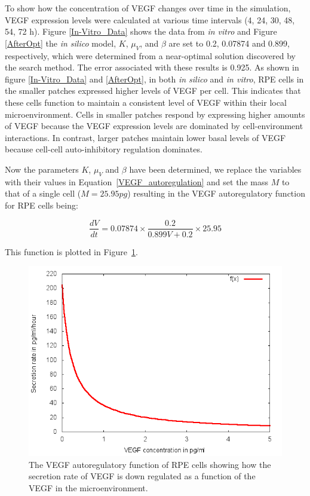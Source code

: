 To show how the concentration of VEGF changes over time in the simulation, VEGF expression levels were calculated at various time intervals (4, 24, 30, 48, 54, 72 h). Figure \ref{In-Vitro_Data} shows the data from \textit{in vitro} and Figure \ref{AfterOpt} the \textit{in silico} model, $K$, $\mu _{V}$, and $\beta$ are set to 0.2, 0.07874 and 0.899, respectively, which were determined from a near-optimal solution discovered by the search method. The error associated with these results is 0.925. %
As shown in figure \ref{In-Vitro_Data} and \ref{AfterOpt}, in both \textit{in silico} and \textit{in vitro}, RPE cells in the smaller patches expressed higher levels of VEGF per cell. This indicates that these cells function to maintain a consistent level of VEGF within their local microenvironment. Cells in smaller patches respond by expressing higher amounts of VEGF because the VEGF expression levels are dominated by cell-environment interactions. In contrast, larger patches maintain lower basal levels of VEGF because cell-cell auto-inhibitory regulation dominates.

Now the parameters $K$, $\mu_V$ and $\beta$ have been determined, we replace the variables with their values in Equation~\ref{VEGF_autoregulation} and set the mass $M$ to that of a single cell ($M = 25.95 pg$) resulting in the VEGF autoregulatory function for RPE cells being:

\begin{equation}
 \frac{d V}{d t}= 0.07874 \times \frac{0.2}{ 0.899 V+0.2} \times 25.95
 \label{VEGF_final}
 \end{equation}

This function is plotted in Figure~\ref{finalGraph}.

\begin{figure}[!t]
\includegraphics[width=.8\linewidth]{./figures/Results/Final_Result.png}
   \caption{The VEGF autoregulatory function of RPE cells showing how the secretion rate of VEGF is down regulated as a function of the VEGF in the microenvironment.}
   \label{finalGraph}
   \end{figure}

